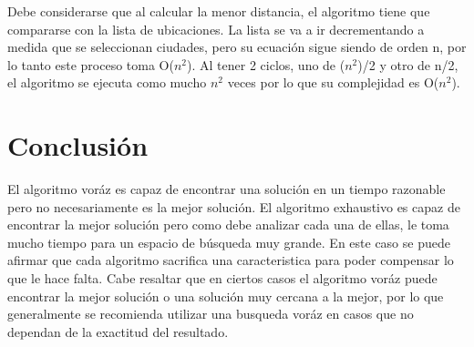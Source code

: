 \documentclass[10pt]{report}
\begin{document}
Debe considerarse que al calcular la menor distancia, el algoritmo tiene que compararse con la lista de ubicaciones. La lista se va a ir decrementando a medida que se seleccionan ciudades, pero su ecuación sigue siendo de orden n, por lo tanto este proceso toma O($n^2$). Al tener 2 ciclos, uno de ($n^2$)/2 y otro de n/2, el algoritmo se ejecuta como mucho $n^2$ veces por lo que su complejidad es O($n^2$).

\section*{Conclusión}

El algoritmo voráz es capaz de encontrar una solución en un tiempo razonable pero no necesariamente es la mejor solución. El algoritmo exhaustivo es capaz de encontrar la mejor solución pero como debe analizar cada una de ellas, le toma mucho tiempo para un espacio de búsqueda muy grande. En este caso se puede afirmar que cada algoritmo sacrifica una caracteristica para poder compensar lo que le hace falta. Cabe resaltar que en ciertos casos el algoritmo voráz puede encontrar la mejor solución o una solución muy cercana a la mejor, por lo que generalmente se recomienda utilizar una busqueda voráz en casos que no dependan de la exactitud del resultado.  
\end{document}
